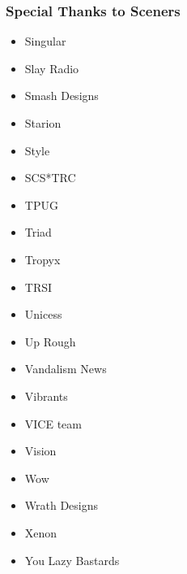 \begin{frame}[noframenumbering]
\frametitle{Special Thanks to Sceners}

\begin{multicols}{3}
\begin{itemize}
\item Singular
\item Slay Radio
\item Smash Designs
\item Starion
\item Style
\item SCS*TRC
\item TPUG
\item Triad
\item Tropyx
\item TRSI
\item Unicess
\item Up Rough
\item Vandalism News
\item Vibrants
\item VICE team
\item Vision
\item Wow
\item Wrath Designs
\item Xenon
\item You Lazy Bastards
\end{itemize}
\end{multicols}

\end{frame}
